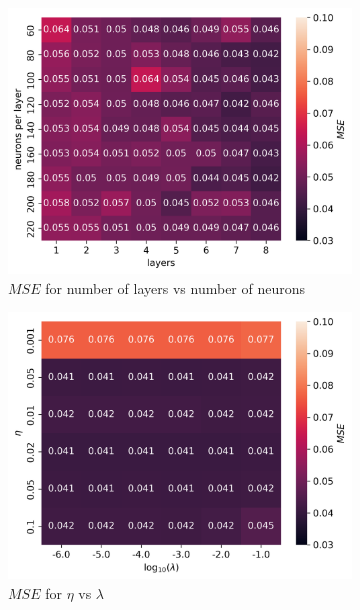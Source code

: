 \documentclass[11pt]{article}
\begin{document}
\begin{figure}[H]
  \begin{subfigure}{.5\textwidth}
    \centering
    \includegraphics[width=\textwidth]{../figures/franke_L_n_test_lrelu_MSE.png}
    \caption{$MSE$ for number of layers vs number of neurons}
    \label{fig:}
  \end{subfigure}
  \begin{subfigure}{.5\textwidth}
    \centering
    \includegraphics[width=\textwidth]{../figures/franke_eta_lmb_lrelu_MSE.png}
    \caption{$MSE$ for $\eta$ vs $\lambda$}
    \label{fig:}
  \end{subfigure}
  \begin{subfigure}{.5\textwidth}

\end{subfigure}
\end{figure}
\end{document}

